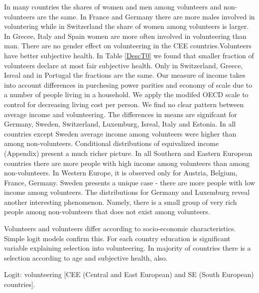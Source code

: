 \documentclass[10pt, letterpaper]{article}
\begin{document}
\begin{spacing}{1.4}
In many countries the shares of women and men among volunteers and non-volunteers are the same. In France and Germany there are more males involved in voluntering while in Switzerland the share of women among volunteers is larger. In Grecee, Italy and Spain women are more often involved in volunteering than man. There are no gender effect on volunteering in the CEE countries.Volunteers have better subjective health.  In Table \ref{DescT0} we found that smaller fraction of volunteers declare at most fair subjective health. Only in Switzerland, Greece, Isreal and in Portugal the fractions are the same.  Our measure of income takes into account differences in purchesing power parities and economy of scale due to a number of people living in a household. We apply the modifed OECD scale to control for decreasing living cost per person. We find no clear pattern between average income and volunteering. The differences in means are signifcant for Germany, Sweden, Switzerland, Luxemburg, Isreal, Italy and Estonia. In all countries except Sweden average income among volunteers were higher than among non-volunteers. Conditional distributions of equivalized income (Appendix) present a much richer picture. In all Southern and Eastern European countries there are more people with high income among volunteers than among non-volunteers. In  Western Europe, it is observed only for  Austria, Belgium, France, Germany. Sweden presents a unique case - there are more people with low income among volunteers. The distributions for Germany and Luxemburg reveal another interesting phenomenon. Namely, there is a small group of very rich people among non-volunteers that does not exist among volunteers.

Volunteers and volunteers differ according to socio-economic characteristics. Simple logit models confirm this. For each country education is significant variable explaining selection into volunteering. In majority of countries there is a selection according to age and subjective health, also. 


\begin{spacing}{.9}
\begin{table}[H]
\centering 
\caption{Logit: volunteering [CEE (Central and East European) and SE (South European) countries].}  
\begin{small} 
	 
      \label{logitCEE} 
\end{small}
\end{table}
\end{spacing}


\end{spacing}
\end{document}
